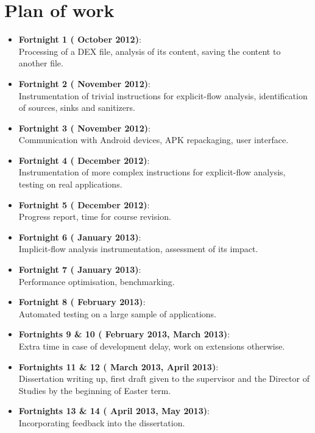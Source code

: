 \documentclass[12pt]{article}
\begin{document}
\section*{Plan of work}

\begin{itemize}

    \item{\textbf{Fortnight 1 ( October 2012)}: \\
          Processing of a DEX file, analysis of its content, saving the 
          content to another file.}
    \item{\textbf{Fortnight 2 ( November 2012)}: \\
          Instrumentation of trivial instructions for explicit-flow analysis,
          identification of sources, sinks and sanitizers.}
    \item{\textbf{Fortnight 3 ( November 2012)}: \\
          Communication with Android devices, APK repackaging, user interface.}
    \item{\textbf{Fortnight 4 ( December 2012)}: \\
          Instrumentation of more complex instructions for explicit-flow
          analysis, testing on real applications.}
    \item{\textbf{Fortnight 5 ( December 2012)}: \\
          Progress report, time for course revision.}
    \item{\textbf{Fortnight 6 ( January 2013)}: \\
          Implicit-flow analysis instrumentation, assessment of its impact.}
    \item{\textbf{Fortnight 7 ( January 2013)}: \\
          Performance optimisation, benchmarking.}
    \item{\textbf{Fortnight 8 ( February 2013)}: \\
          Automated testing on a large sample of applications.}
    \item{\textbf{Fortnights 9 \& 10 ( February 2013, 
                                        March 2013)}: \\
          Extra time in case of development delay, work on extensions
          otherwise.}
    \item{\textbf{Fortnights 11 \& 12 ( March 2013, 
                                        April 2013)}: \\
          Dissertation writing up, first draft given to the supervisor and
          the Director of Studies by the beginning of Easter term.}
    \item{\textbf{Fortnights 13 \& 14 ( April 2013, 
                                        May 2013)}: \\
         Incorporating feedback into the dissertation.}
    

\end{itemize}
\end{document}
